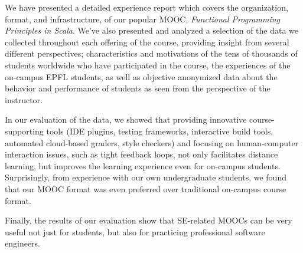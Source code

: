 \documentclass{sig-alternate}
\begin{document}
We have presented a detailed experience report which covers the organization, format,
and infrastructure, of our popular MOOC, {\em Functional Programming Principles in Scala}.
We've also presented and analyzed a selection of the data we collected
throughout each offering of the course, providing insight from several different perspectives;
characteristics and motivations of the tens of thousands of students worldwide who have
participated in the course, the experiences of the on-campus EPFL students, as well as objective
anonymized data about the behavior and performance of students as seen from the perspective of
the instructor.

In our evaluation of the data, we showed that providing innovative course-supporting tools
(IDE plugins, testing frameworks, interactive build tools, automated cloud-based graders, style checkers)
and focusing on human-computer interaction issues, such as tight feedback loops, not only facilitates
distance learning, but improves the learning experience even for on-campus students. Surprisingly,
from experience with our own undergraduate students, we found that our MOOC format was even
preferred over traditional on-campus course format.

Finally, the results of our evaluation show that SE-related MOOCs can be very useful not just for
students, but also for practicing professional software engineers.

%

%
%
\end{document}
